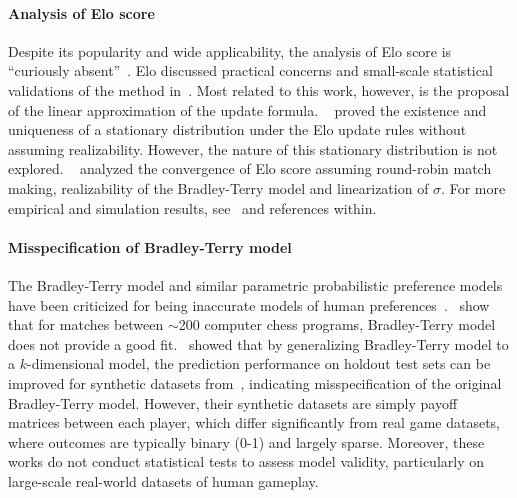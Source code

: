 \paragraph{Analysis of Elo score} Despite its popularity and wide applicability, the analysis of Elo score is ``curiously absent''~\citep{aldous2017elo}.
Elo discussed practical concerns and small-scale statistical validations of the method in~\citet{elo1978rating}. Most related to this work, however, is the proposal of the linear approximation of the update formula.
~\citet{aldous2017elo} proved the existence and uniqueness of a stationary distribution under the Elo update rules without assuming realizability. However, the nature of this stationary distribution is not explored.
~\citet{de2024stochastic} analyzed the convergence of Elo score assuming round-robin match making, realizability of the Bradley-Terry model and linearization of $\sigma$.
For more empirical and simulation results, see~\citet{kiraly2017modelling} and references within.


\paragraph{Misspecification of Bradley-Terry model} The Bradley-Terry model and similar parametric probabilistic preference models have been criticized for being inaccurate models of human preferences~\citep{ballinger1997decisions}.~\citet{oliveira2018new} show that for matches between $\sim$200 computer chess programs, Bradley-Terry model does not provide a good fit.~\citet{bertrand2023limitations} showed that by generalizing Bradley-Terry model to a $k$-dimensional model, the prediction performance on holdout test sets can be improved for synthetic datasets from~\citet{czarnecki2020real}, indicating misspecification of the original Bradley-Terry model. However, their synthetic datasets are simply payoff matrices between each player,
which differ significantly from real game datasets, where outcomes are typically binary (0-1) and largely sparse. Moreover, these works do not conduct statistical tests to assess model validity, particularly on large-scale real-world datasets of human gameplay.



